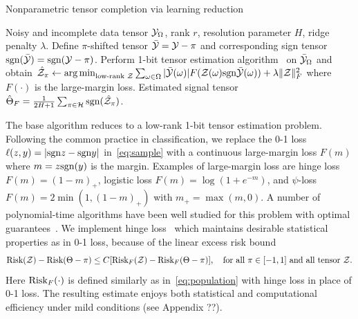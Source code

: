 \documentclass{article}
\theoremstyle{plain}
\theoremstyle{definition}
\def\sign{\textup{sgn}}
\def\risk{\textup{Risk}}
\begin{document}
\vspace{-.2cm}
\begin{algorithm}[h!]
  \caption{Nonparametric tensor completion via learning reduction}\label{alg:tensorT}
 \begin{algorithmic}[1] 
\INPUT Noisy and incomplete data tensor $\mathcal{Y}_\Omega$, rank $r$, resolution parameter $H$, ridge penalty $\lambda$.
\State Define $\pi$-shifted tensor $\bar {\mathcal{Y}}=\mathcal{Y}-\pi$ and corresponding sign tensor $\sign(\bar \tY)=\sign(\tY-\pi)$. 
\State Perform 1-bit tensor estimation algorithm~\citep{ghadermarzy2018learning,wang2018learning,hong2020generalized,alquier2019estimation} on $\bar {\mathcal{Y}}_\Omega$ and obtain $\hat \tZ_\pi\leftarrow \argmin_{\text{low-rank }\tZ}\sum_{\omega\in \Omega} |\bar \tY(\omega)|F(\tZ(\omega)\sign\bar \tY(\omega))+\lambda\FnormSize{}{\tZ}^2$ where $F(\cdot)$ is the large-margin loss.
\EndFor
\OUTPUT Estimated signal tensor $\hat \Theta_F={1\over 2H+1}\sum_{\pi \in \tH}\sign(\hat \tZ_\pi)$.
\vspace{-.1cm}
\end{algorithmic}
\end{algorithm}
\vspace{-.2cm}

The base algorithm reduces to a low-rank 1-bit tensor estimation problem. Following the common practice in classification, we replace the 0-1 loss $\ell(z,y)=|\sign z - \sign y|$ in~\eqref{eq:sample} with a continuous large-margin loss $F(m)$ where $m=z\sign(y)$ is the margin. Examples of large-margin loss are hinge loss $F(m) = (1-m)_+$, logistic loss $F(m) =\log(1+e^{-m})$, and $\psi$-loss $F(m)=2\min(1,(1-m)_+)$ with $m_{+}=\max(m,0)$. A number of polynomial-time algorithms have been well studied for this problem with optimal guarantees~\citep{ghadermarzy2018learning,wang2018learning,hong2020generalized,alquier2019estimation}. We implement hinge loss~\cite{alquier2019estimation,genzel2020robust} which maintains desirable statistical properties as in 0-1 loss, because of the linear excess risk bound
\[
\risk(\tZ)-\risk(\Theta-\pi)\leq C[\risk_F(\tZ)-\risk_F(\Theta-\pi)],\quad \text{for all }\pi\in[-1,1] \text{ and all tensor }\tZ.
\]
Here $\risk_F(\cdot)$ is defined similarly as in~\eqref{eq:population} with hinge loss in place of 0-1 loss. The resulting estimate enjoys both statistical and computational efficiency under mild conditions (see Appendix {\color{red} ??}). 
\end{document}
